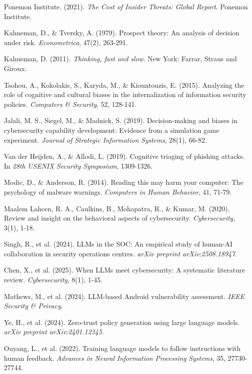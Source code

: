 \documentclass[11pt, a4paper]{article}
\begin{document}
\begin{thebibliography}{99}
Ponemon Institute. (2021). \textit{The Cost of Insider Threats: Global Report}. Ponemon Institute.

Kahneman, D., \& Tversky, A. (1979). Prospect theory: An analysis of decision under risk. \textit{Econometrica}, 47(2), 263-291.

Kahneman, D. (2011). \textit{Thinking, fast and slow}. New York: Farrar, Straus and Giroux.

Tsohou, A., Kokolakis, S., Karyda, M., \& Kiountouzis, E. (2015). Analyzing the role of cognitive and cultural biases in the internalization of information security policies. \textit{Computers \& Security}, 52, 128-141.

Jalali, M. S., Siegel, M., \& Madnick, S. (2019). Decision-making and biases in cybersecurity capability development: Evidence from a simulation game experiment. \textit{Journal of Strategic Information Systems}, 28(1), 66-82.

Van der Heijden, A., \& Allodi, L. (2019). Cognitive triaging of phishing attacks. In \textit{28th USENIX Security Symposium}, 1309-1326.

Modic, D., \& Anderson, R. (2014). Reading this may harm your computer: The psychology of malware warnings. \textit{Computers in Human Behavior}, 41, 71-79.

Maalem Lahcen, R. A., Caulkins, B., Mohapatra, R., \& Kumar, M. (2020). Review and insight on the behavioral aspects of cybersecurity. \textit{Cybersecurity}, 3(1), 1-18.

Singh, R., et al. (2024). LLMs in the SOC: An empirical study of human-AI collaboration in security operations centres. \textit{arXiv preprint arXiv:2508.18947}.

Chen, X., et al. (2025). When LLMs meet cybersecurity: A systematic literature review. \textit{Cybersecurity}, 8(1), 1-45.

Mathews, M., et al. (2024). LLM-based Android vulnerability assessment. \textit{IEEE Security \& Privacy}.

Ye, H., et al. (2024). Zero-trust policy generation using large language models. \textit{arXiv preprint arXiv:2401.12345}.

Ouyang, L., et al. (2022). Training language models to follow instructions with human feedback. \textit{Advances in Neural Information Processing Systems}, 35, 27730-27744.


\end{thebibliography}
\end{document}
